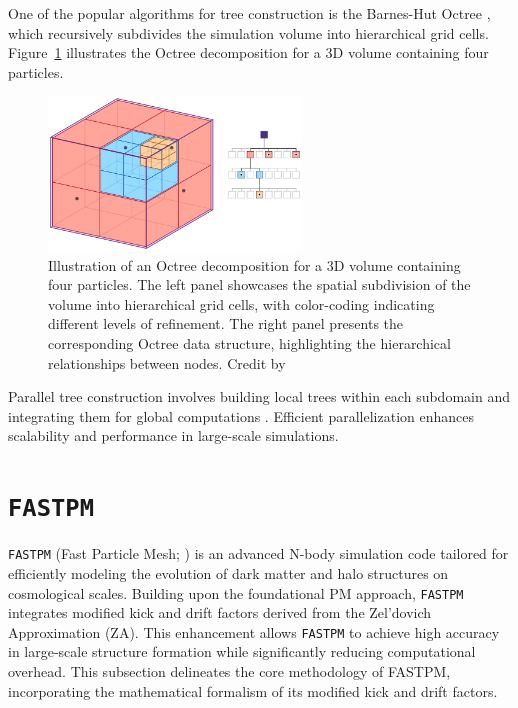 One of the popular algorithms for tree construction is the Barnes-Hut Octree \citep{1986Natur.324..446B}, which recursively subdivides the simulation volume into hierarchical grid cells. Figure~\ref{fig:barnes-hut} illustrates the Octree decomposition for a 3D volume containing four particles.
\begin{figure}[ht]
    \centering
    \includegraphics[width=0.6\textwidth]{figures/Octree.png}
    \caption[Illustration of an Octree decomposition]{Illustration of an Octree decomposition for a 3D volume containing four particles. The left panel showcases the spatial subdivision of the volume into hierarchical grid cells, with color-coding indicating different levels of refinement. The right panel presents the corresponding Octree data structure, highlighting the hierarchical relationships between nodes. Credit by \citet{Powell2023}}
    \label{fig:barnes-hut}
\end{figure}

Parallel tree construction involves building local trees within each subdomain and integrating them for global computations \citep{DUBINSKI1996133}. Efficient parallelization enhances scalability and performance in large-scale simulations.

\section{\texttt{FASTPM}} \label{sec:fastpm}
\texttt{FASTPM} (Fast Particle Mesh; \citealt{10.1093/mnras/stw2123}) is an advanced N-body simulation code tailored for efficiently modeling the evolution of dark matter and halo structures on cosmological scales. Building upon the foundational PM approach, \texttt{FASTPM} integrates modified kick and drift factors derived from the Zel'dovich Approximation (ZA). This enhancement allows \texttt{FASTPM} to achieve high accuracy in large-scale structure formation while significantly reducing computational overhead. This subsection delineates the core methodology of FASTPM, incorporating the mathematical formalism of its modified kick and drift factors.

